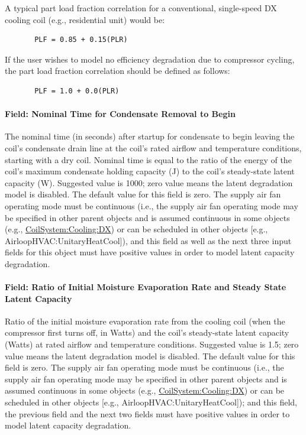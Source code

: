 A typical part load fraction correlation for a conventional, single-speed DX cooling coil (e.g., residential unit) would be:

\begin{lstlisting}
       PLF = 0.85 + 0.15(PLR)
\end{lstlisting}

If the user wishes to model no efficiency degradation due to compressor cycling, the part load fraction correlation should be defined as follows:

\begin{lstlisting}
       PLF = 1.0 + 0.0(PLR)
\end{lstlisting}

\paragraph{Field: Nominal Time for Condensate Removal to Begin}\label{field-nominal-time-for-condensate-removal-to-begin-2}

The nominal time (in seconds) after startup for condensate to begin leaving the coil's condensate drain line at the coil's rated airflow and temperature conditions, starting with a dry coil. Nominal time is equal to the ratio of the energy of the coil's maximum condensate holding capacity (J) to the coil's steady-state latent capacity (W). Suggested value is 1000; zero value means the latent degradation model is disabled. The default value for this field is zero. The supply air fan operating mode must be continuous (i.e., the supply air fan operating mode may be specified in other parent objects and is assumed continuous in some objects (e.g., \hyperref[coilsystemcoolingdx]{CoilSystem:Cooling:DX}) or can be scheduled in other objects {[}e.g., AirloopHVAC:UnitaryHeatCool{]}), and this field as well as the next three input fields for this object must have positive values in order to model latent capacity degradation.

\paragraph{Field: Ratio of Initial Moisture Evaporation Rate and Steady State Latent Capacity}\label{field-ratio-of-initial-moisture-evaporation-rate-and-steady-state-latent-capacity-2}

Ratio of the initial moisture evaporation rate from the cooling coil (when the compressor first turns off, in Watts) and the coil's steady-state latent capacity (Watts) at rated airflow and temperature conditions. Suggested value is 1.5; zero value means the latent degradation model is disabled. The default value for this field is zero. The supply air fan operating mode must be continuous (i.e., the supply air fan operating mode may be specified in other parent objects and is assumed continuous in some objects (e.g., \hyperref[coilsystemcoolingdx]{CoilSystem:Cooling:DX}) or can be scheduled in other objects {[}e.g., AirloopHVAC:UnitaryHeatCool{]}); and this field, the previous field and the next two fields must have positive values in order to model latent capacity degradation.


